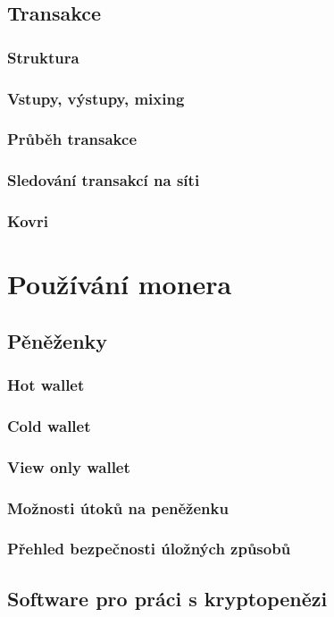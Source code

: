 \documentclass[
  printed, %
  table,   %
  nolof,     %
  nolot,     %
           oneside, color
]{fithesis3}
\begin{document}
\section{Transakce}
\subsection{Struktura}
\subsection{Vstupy, výstupy, mixing}
\subsection{Průběh transakce}
\subsection{Sledování transakcí na síti}
\subsection{Kovri}

\chapter{Používání monera}
\section{Pěněženky}
\subsection{Hot wallet}
\subsection{Cold wallet}
\subsection{View only wallet}
\subsection{Možnosti útoků na peněženku}
\subsection{Přehled bezpečnosti úložných způsobů}
\section{Software pro práci s kryptopenězi}
\end{document}
